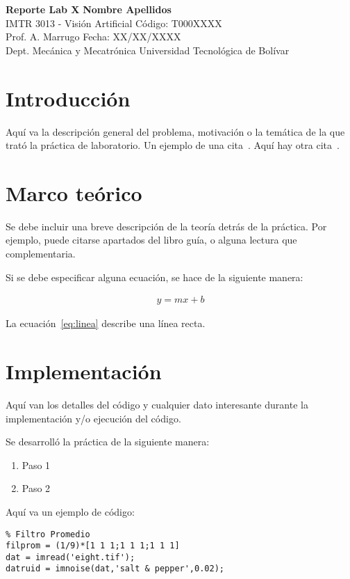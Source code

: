 \documentclass[a4paper, 11pt]{article}
\begin{document}
\noindent
\large\textbf{Reporte Lab X } \hfill \textbf{Nombre Apellidos} \\
\normalsize IMTR 3013 - Visión Artificial \hfill Código: T000XXXX \\
Prof. A. Marrugo \hfill Fecha: XX/XX/XXXX \\
Dept. Mecánica y Mecatrónica \hfill Universidad Tecnológica de Bolívar

\section*{Introducción}
Aquí va la descripción general del problema, motivación o la temática de la que trató la práctica de laboratorio. Un ejemplo de una cita~\cite[p.219]{Robotics}. Aquí hay otra cita~\cite{Flueck}.

\section*{Marco teórico}
Se debe incluir una breve descripción de la teoría detrás de la práctica. Por ejemplo, puede citarse apartados del libro guía, o alguna lectura que complementaria.

Si se debe especificar alguna ecuación, se hace de la siguiente manera:

\begin{align}
y = mx+b
\label{eq:linea}
\end{align}

La ecuación~\eqref{eq:linea} describe una línea recta.

\section*{Implementación}
Aquí van los detalles del código y cualquier dato interesante durante la implementación y/o ejecución del código.

Se desarrolló la práctica de la siguiente manera:
\begin{enumerate}
	\item Paso 1
	\item Paso 2
\end{enumerate}	

Aquí va un ejemplo de código:

\begin{verbatim}
% Filtro Promedio
filprom = (1/9)*[1 1 1;1 1 1;1 1 1]
dat = imread('eight.tif');
datruid = imnoise(dat,'salt & pepper',0.02);
\end{verbatim}
\end{document}
